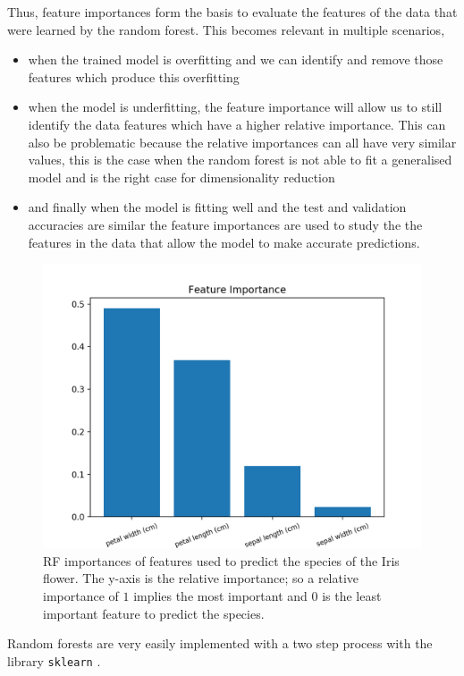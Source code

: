 Thus, feature importances form the basis to evaluate the features of the data that were learned by the random forest.
This becomes relevant in multiple scenarios, 
\begin{itemize}
    \item when the trained model is overfitting and we can identify and remove those features which produce this overfitting 
    \item when the model is underfitting, the feature importance will allow us to still identify the data features which have a higher relative importance. 
    This can also be problematic because the relative importances can all have very similar values, this is the case when the random forest is not able to fit a generalised model and is the right case for dimensionality reduction
    \item and finally when the model is fitting well and the test and validation accuracies are similar the feature importances are used to study the the features in the data that allow the model to make accurate predictions.
\end{itemize}
\begin{figure}
    \centering
    \includegraphics{images/Chapter3/feature_importances_Randomforest.png}
    \caption{RF importances of features used to predict the species of the Iris flower. The y-axis is the relative importance; so a relative importance of $1$ implies the most important and $0$ is the least important feature to predict the species.}
    \label{fig:RF sample FI}
\end{figure}

Random forests are very easily implemented with a two step process with the library \texttt{sklearn} \citep[][]{2011JRFsklearn}.
